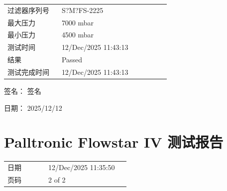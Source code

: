 \documentclass[UTF8,10pt,a4paper,fontset=fandol]{ctexart}
\newcommand{\fieldvalue}[1]{#1}
\newcommand{\handwritten}[1]{#1}
\begin{document}
\begin{tabular}{@{}p{0.30\linewidth}p{0.60\linewidth}@{}}
过滤器序列号 &
\fieldvalue{S?M?FS-2225} \\

最大压力 &
\fieldvalue{7000 mbar} \\

最小压力 &
\fieldvalue{4500 mbar} \\

测试时间 &
\fieldvalue{12/Dec/2025 11:43:13} \\

结果 &
\fieldvalue{Passed} \\

测试完成时间 &
\fieldvalue{12/Dec/2025 11:43:13} \\
\end{tabular}

\vspace{1em}

签名：%
\fieldvalue{\handwritten{签名}}

\hspace{2em}日期：%
\fieldvalue{\handwritten{2025/12/12}}

\vspace{2em}

\section*{Palltronic Flowstar IV 测试报告}

\begin{tabular}{@{}p{0.30\linewidth}p{0.60\linewidth}@{}}
日期 &
\fieldvalue{12/Dec/2025 11:35:50} \\

页码 &
\fieldvalue{2 of 2} \\
\end{tabular}

\vspace{1em}
\end{document}
